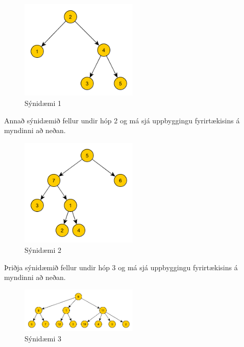 \begin{figure}[h!]
  \centering
    \includegraphics[width=0.5\textwidth]{sample1}
  \caption{Sýnidæmi 1}
\end{figure}

Annað sýnidæmið fellur undir hóp 2 og má sjá uppbyggingu fyrirtækisins á myndinni að neðan.
\begin{figure}[h!]
  \centering
    \includegraphics[width=0.5\textwidth]{sample2}
  \caption{Sýnidæmi 2}
\end{figure}

Þriðja sýnidæmið fellur undir hóp 3 og má sjá uppbyggingu fyrirtækisins á myndinni að neðan.
\begin{figure}[h!]
  \centering
    \includegraphics[width=0.5\textwidth]{sample3}
  \caption{Sýnidæmi 3}
\end{figure}
